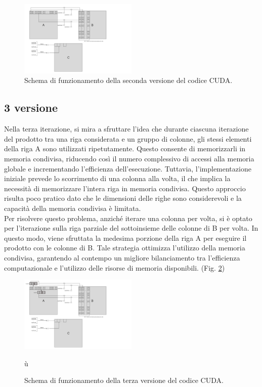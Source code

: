 \documentclass[conference]{IEEEtran}
\begin{document}
\begin{figure}
    \centering
    \includegraphics[width=0.5\textwidth]{resources/cuda_scheme_v2.png}
    \caption{Schema di funzionamento della seconda versione del codice CUDA.}
    \label{fig:cuda_scheme_v2}
\end{figure}

\subsection{3 versione}
Nella terza iterazione, si mira a sfruttare l'idea che durante ciascuna iterazione del prodotto tra una riga considerata e un gruppo di colonne, gli stessi elementi della riga A sono utilizzati ripetutamente. Questo consente di memorizzarli in memoria condivisa, riducendo così il numero complessivo di accessi alla memoria globale e incrementando l'efficienza dell'esecuzione. Tuttavia, l'implementazione iniziale prevede lo scorrimento di una colonna alla volta, il che implica la necessità di memorizzare l'intera riga in memoria condivisa. Questo approccio risulta poco pratico dato che le dimensioni delle righe sono considerevoli e la capacità della memoria condivisa è limitata. \\ Per risolvere questo problema, anziché iterare una colonna per volta, si è optato per l'iterazione sulla riga parziale del sottoinsieme delle colonne di B per volta. In questo modo, viene sfruttata la medesima porzione della riga A per eseguire il prodotto con le colonne di B. Tale strategia ottimizza l'utilizzo della memoria condivisa, garantendo al contempo un migliore bilanciamento tra l'efficienza computazionale e l'utilizzo delle risorse di memoria disponibili. (Fig. \ref{fig:cuda_scheme_v3})

\begin{figure}
    \centering
    \includegraphics[width=0.5\textwidth]{resources/cuda_scheme_v3.png}
    \caption{Schema di funzionamento della terza versione del codice CUDA.}
    \label{fig:cuda_scheme_v3}ù
\end{figure}
\end{document}
